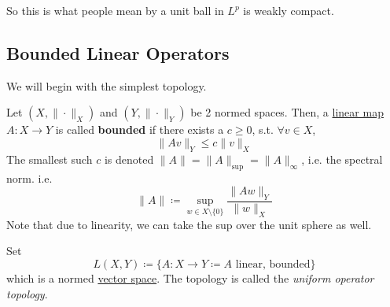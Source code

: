   So this is what people mean by a unit ball in $L^p$ is weakly compact. 

\subsection{Bounded Linear Operators}

	We will begin with the simplest topology. 

  \begin{definition}
    \label{def:bounded-linear-operators}
    Let $(X, \|\cdot\|_X)$ and $(Y, \|\cdot\|_Y)$ be 2 normed spaces. Then, a \hyperref[lin-def:linear_map]{linear map} $A: X \to Y$ is called \textbf{bounded} if there exists a $c \geq 0$, s.t. $\forall v \in X$, 
    \begin{equation}
      \|Av \|_Y \leq c \|v\|_X
    \end{equation}
    The smallest such $c$ is denoted $\|A\| = \|A\|_{\mathrm{sup}} = \|A\|_\infty$, i.e. the spectral norm. i.e. 
    \begin{equation}
      \|A\| \coloneqq \sup_{w \in X \setminus \{0\}} \frac{\|Aw\|_Y}{\|w\|_X}
    \end{equation}
    Note that due to linearity, we can take the sup over the unit sphere as well. 
  \end{definition}

  Set 
  \begin{equation}
    L(X, Y) \coloneqq \{A : X \to Y \coloneq A \text{ linear, bounded}\}
  \end{equation}
  which is a normed \hyperref[lin-def:vector-space]{vector space}. The topology is called the \textit{uniform operator topology}. 


